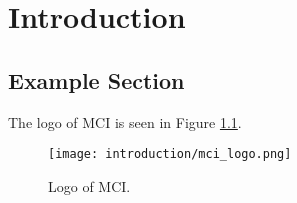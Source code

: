\documentclass[../../main.tex]{subfiles}
\begin{document}
\chapter{Introduction}



\section{Example Section}
The logo of MCI is seen in Figure \ref{fig:mci_logo}.
\begin{figure}[H]
	\centerline{\texttt{[image: introduction/mci\_logo.png]}}
	\caption[Logo of MCI]{Logo of MCI\cite{mci_logo}.}
	\label{fig:mci_logo}
\end{figure}

\end{document}
